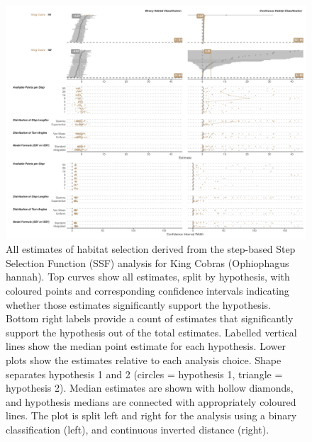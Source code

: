 \documentclass[10pt,a4paper]{article}
\begin{document}
\begin{figure}[h]
\includegraphics[width=1\linewidth]{../../figures/specCurve_King Cobra_ssf} \caption{All estimates of habitat selection derived from the step-based Step Selection Function (SSF) analysis for King Cobras (Ophiophagus hannah). Top curves show all estimates, split by hypothesis, with coloured points and corresponding confidence intervals indicating whether those estimates significantly support the hypothesis. Bottom right labels provide a count of estimates that significantly support the hypothesis out of the total estimates. Labelled vertical lines show the median point estimate for each hypothesis. Lower plots show the estimates relative to each analysis choice. Shape separates hypothesis 1 and 2 (circles = hypothesis 1, triangle = hypothesis 2). Median estimates are shown with hollow diamonds, and hypothesis medians are connected with appropriately coloured lines. The plot is split left and right for the analysis using a binary classification (left), and continuous inverted distance (right).}\label{fig:specCurveSsfOPHA}
\end{figure}
\end{document}
